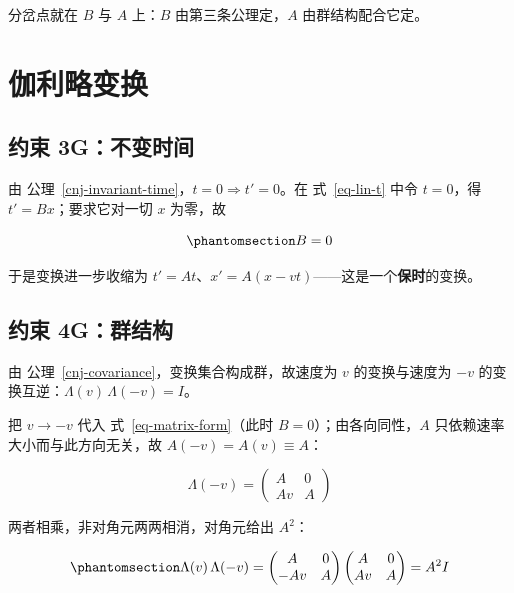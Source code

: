 \documentclass[
  chinese,
  a4paper,
  UTF8,
  12pt,
  oneside,
  openany]{ctexbook}
\theoremstyle{plain}
\theoremstyle{plain}
\theoremstyle{plain}
\theoremstyle{definition}
\theoremstyle{plain}
\theoremstyle{plain}
\theoremstyle{remark}
\begin{document}
分岔点就在 \(B\) 与 \(A\) 上：\(B\) 由第三条公理定，\(A\)
由群结构配合它定。

\section{伽利略变换}\label{ux4f3dux5229ux7565ux53d8ux6362}

\subsection{约束
3G：不变时间}\label{ux7ea6ux675f-3gux4e0dux53d8ux65f6ux95f4}

由 公理~\ref{cnj-invariant-time}，\(t = 0 \Rightarrow t' = 0\)。在
式~\ref{eq-lin-t} 中令 \(t = 0\)，得 \(t' = Bx\)；要求它对一切 \(x\)
为零，故

\begin{equation}\protect\phantomsection\label{eq-constraint-time}{
B = 0
}\end{equation}

于是变换进一步收缩为
\(t' = A t\)、\(x' = A(x - vt)\)------这是一个\textbf{保时}的变换。

\subsection{约束 4G：群结构}\label{ux7ea6ux675f-4gux7fa4ux7ed3ux6784}

由 公理~\ref{cnj-covariance}，变换集合构成群，故速度为 \(v\)
的变换与速度为 \(-v\) 的变换互逆：\(\Lambda(v)\,\Lambda(-v) = I\)。

把 \(v \to -v\) 代入 式~\ref{eq-matrix-form}（此时
\(B = 0\)）；由各向同性，\(A\) 只依赖速率大小而与此方向无关，故
\(A(-v) = A(v) \equiv A\)：

\[
\Lambda(-v) = \begin{pmatrix} A & 0 \\ Av & A \end{pmatrix}
\]

两者相乘，非对角元两两相消，对角元给出 \(A^{2}\)：

\begin{equation}\protect\phantomsection\label{eq-galilean-product}{
\Lambda(v)\,\Lambda(-v)
=
\begin{pmatrix} A & 0 \\ -Av & A \end{pmatrix}
\begin{pmatrix} A & 0 \\ Av & A \end{pmatrix}
=
A^{2} I
}\end{equation}
\end{document}
